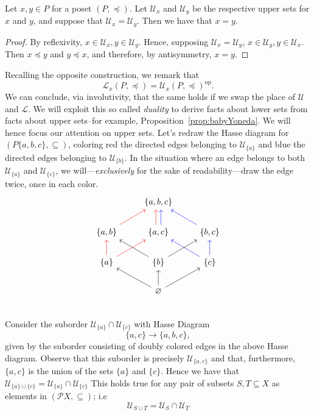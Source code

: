 \begin{prop}\label{prop:babyYoneda}
Let $x,y\in P$ for a poset $(P,\preceq)$. Let $\mathcal{U}_x$ and $\mathcal{U}_y$ be the respective upper sets for $x$ and $y$, and suppose that $\mathcal{U}_x=\mathcal{U}_y$. Then we have that $x=y$.
\end{prop}

\begin{proof}
By reflexivity, $x\in\mathcal{U}_x,y\in\mathcal{U}_y$. Hence, supposing $\mathcal{U}_x=\mathcal{U}_y$, $x\in\mathcal{U}_y,y\in\mathcal{U}_x$. Then $x\preceq y$ and $y\preceq x$, and therefore, by antisymmetry, $x=y$.
\end{proof}

Recalling the opposite construction, we remark that \[\mathcal{L}_x(P,\preceq)=\mathcal{U}_x(P,\preceq)^\text{op}.\]
We can conclude, via involutivity, that the same holds if we swap the place of $\mathcal{U}$ and $\mathcal{L}$. We will exploit this so called \emph{duality} to derive facts about lower sets from facts about upper sets--for example, Proposition~\ref{prop:babyYoneda}. We will hence focus our attention on upper sets. Let's redraw the Hasse diagram for $(P\{a,b,c\},\subseteq)$, coloring red the directed edges belonging to $\mathcal{U}_{\{a\}}$ and blue the directed edges belonging to $\mathcal{U}_{\{b\}}$. In the situation where an edge belongs to both $\mathcal{U}_{\{a\}}$ and $\mathcal{U}_{\{c\}}$, we will---\emph{exclusively} for the sake of readability---draw the edge twice, once in each color. 
\begin{equation}
\begin{tikzcd}
 & \{a,b,c\} & \\
 \{a,b\} \arrow[ur,red] & \{a,c\} \arrow[u,red,shift left = 0.7 ex] \arrow[u,blue,shift right = 0.7 ex]   & \{b,c\} \arrow[ul,blue] \\
 \{a\} \arrow[u, red] \arrow[ur,red] & \{b\} \arrow[ul] \arrow[ur] & \{c\} \arrow[u,blue] \arrow[ul,blue] \\
 & \varnothing \arrow[ul] \arrow[u] \arrow[ur] & \\
\end{tikzcd}
\end{equation}
Consider the suborder $\mathcal{U}_{\{a\}}\cap\mathcal{U}_{\{c\}}$ with Hasse Diagram
\[\{a,c\}\to\{a,b,c\},\]
given by the suborder consisting of doubly colored edges in the above Hasse diagram. Observe that this suborder is precisely $\mathcal{U}_{\{a,c\}}$ and that, furthermore, $\{a,c\}$ is the union of the sets $\{a\}$ and $\{c\}$. Hence we have that $\mathcal{U}_{\{a\}\cup\{c\}}=\mathcal{U}_{\{a\}}\cap\mathcal{U}_{\{c\}}$ This holds true for any pair of subsets $S,T\subseteq X$ as elements in $(\mathcal{P}X,\subseteq)$; i.e
\[\mathcal{U}_{S\cup T}=\mathcal{U}_S\cap\mathcal{U}_T\]

